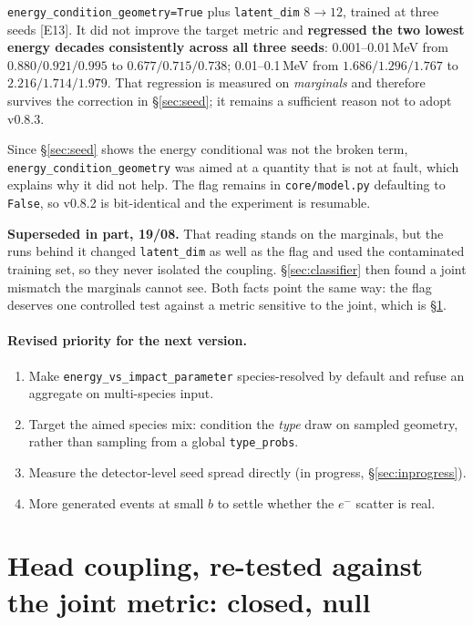 \documentclass[11pt,a4paper]{article}
\newcommand{\ev}[1]{{\footnotesize\textcolor{prov}{[#1]}}}
\begin{document}
\texttt{energy\_condition\_geometry=True} plus \texttt{latent\_dim} $8\to12$,
trained at three seeds \ev{E13}. It did not improve the target metric and
\textbf{regressed the two lowest energy decades consistently across all three
seeds}: 0.001--0.01\,MeV from $0.880/0.921/0.995$ to $0.677/0.715/0.738$;
0.01--0.1\,MeV from $1.686/1.296/1.767$ to $2.216/1.714/1.979$. That regression
is measured on \emph{marginals} and therefore survives the correction in
\S\ref{sec:seed}; it remains a sufficient reason not to adopt v0.8.3.

Since \S\ref{sec:seed} shows the energy conditional was not the broken term,
\texttt{energy\_condition\_geometry} was aimed at a quantity that is not at
fault, which explains why it did not help. The flag remains in
\texttt{core/model.py} defaulting to \texttt{False}, so v0.8.2 is bit-identical
and the experiment is resumable.

\textbf{Superseded in part, 19/08.} That reading stands on the marginals, but the
runs behind it changed \texttt{latent\_dim} as well as the flag and used the
contaminated training set, so they never isolated the coupling.
\S\ref{sec:classifier} then found a joint mismatch the marginals cannot see. Both
facts point the same way: the flag deserves one controlled test against a metric
sensitive to the joint, which is \S\ref{sec:coupling}.

\paragraph{Revised priority for the next version.}
\begin{enumerate}[nosep]
  \item Make \texttt{energy\_vs\_impact\_parameter} species-resolved by default
        and refuse an aggregate on multi-species input.
  \item Target the aimed species mix: condition the \emph{type} draw on sampled
        geometry, rather than sampling from a global \texttt{type\_probs}.
  \item Measure the detector-level seed spread directly (in progress,
        \S\ref{sec:inprogress}).
  \item More generated events at small $b$ to settle whether the $e^{-}$
        scatter is real.
\end{enumerate}

\section{Head coupling, re-tested against the joint metric: closed, null}
\label{sec:coupling}
\end{document}
